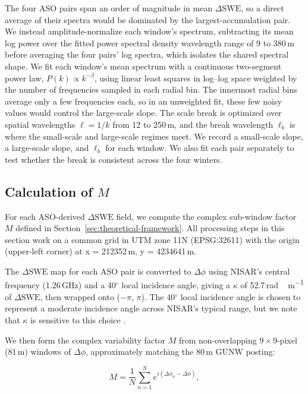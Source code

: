\documentclass[tc, manuscript]{copernicus}
\begin{document}
The four ASO pairs span an order of magnitude in mean $\Delta\mathrm{SWE}$, so a direct average of their spectra would be dominated by the largest-accumulation pair. We instead amplitude-normalize each window's spectrum, subtracting its mean log power over the fitted power spectral density wavelength range of 9 to 380\,\unit{m} before averaging the four pairs' log spectra, which isolates the shared spectral shape. We fit each window's mean spectrum with a continuous two-segment power law, $P(k)\propto k^{-\beta}$, using linear least squares in log--log space weighted by the number of frequencies sampled in each radial bin. The innermost radial bins average only a few frequencies each, so in an unweighted fit, these few noisy values would control the large-scale slope. The scale break is optimized over spatial wavelengths $\ell=1/k$ from 12 to 250\,\unit{m}, and the break wavelength $\ell_b$ is where the small-scale and large-scale regimes meet. We record a small-scale slope, a large-scale slope, and $\ell_b$ for each window. We also fit each pair separately to test whether the break is consistent across the four winters.

\subsection{Calculation of $M$}\label{subsec:calc-M}

For each ASO-derived $\Delta\mathrm{SWE}$ field, we compute the complex sub-window factor $M$ defined in Section~\ref{sec:theoretical-framework}. All processing steps in this section work on a common grid in UTM zone 11N (EPSG:32611) with the origin (upper-left corner) at x = 212352\,\unit{m}, y = 4234641\,\unit{m}.

The $\Delta\mathrm{SWE}$ map for each ASO pair is converted to $\Delta\phi$ using NISAR's central frequency (1.26\,\unit{GHz}) and a 40$^{\circ}$ local incidence angle, giving a $\kappa$ of 52.7\,\unit{rad\,m^{-1}} of $\Delta\mathrm{SWE}$, then wrapped onto ($-\pi$, $\pi$). The 40$^{\circ}$ local incidence angle is chosen to represent a moderate incidence angle across NISAR's typical range, but we note that $\kappa$ is sensitive to this choice \citep{Leinss2015}.

We then form the complex variability factor $M$ from non-overlapping $9\times9$-pixel (81\,\unit{m}) windows of $\Delta\phi$, approximately matching the 80\,\unit{m} GUNW posting:

\begin{equation}\label{eq:calc_m}
    M = \frac{1}{N}\sum_{n=1}^{N} e^{i(\Delta\phi_n - \overline{\Delta\phi})},
\end{equation}
\end{document}
